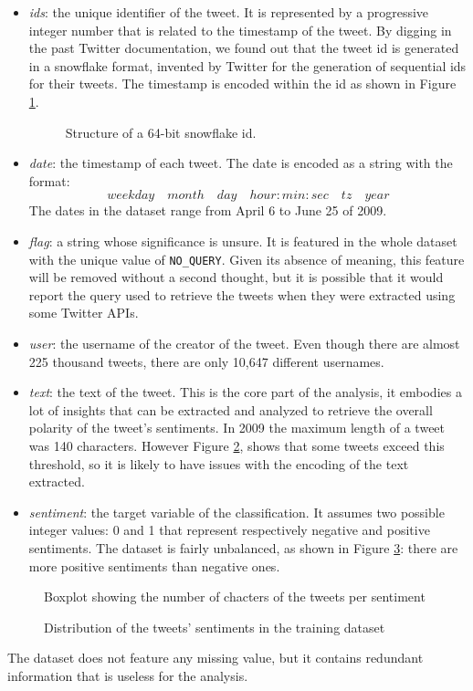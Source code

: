 \documentclass[conference]{IEEEtran}
\begin{document}
\begin{itemize}
    \item \textit{ids}: the unique identifier of the tweet. It is represented by a progressive integer number that is related to the timestamp of the tweet. By digging in the past Twitter documentation, we found out that the tweet id is generated in a snowflake format\cite{snowflake}, invented by Twitter for the generation of sequential ids for their tweets. The timestamp is encoded within the id as shown in Figure \ref{fig:snowflake}.
    \begin{figure}[h]
        \centering
        
        \caption{Structure of a 64-bit snowflake id.}
        \label{fig:snowflake}
\end{figure}
    \item \textit{date}: the timestamp of each tweet. The date is encoded as a string with the format:
    $$weekday \quad month \quad day \quad hour:min:sec \quad tz \quad year$$
    The dates in the dataset range from April 6 to June 25 of 2009.
    \item \textit{flag}: a string whose significance is unsure. It is featured in the whole dataset with the unique value of \texttt{NO\_QUERY}. Given its absence of meaning, this feature will be removed without a second thought, but it is possible that it would report the query used to retrieve the tweets when they were extracted using some Twitter APIs.
    \item \textit{user}: the username of the creator of the tweet. Even though there are almost 225 thousand tweets, there are only 10,647 different usernames.
    \item \textit{text}: the text of the tweet. This is the core part of the analysis, it embodies a lot of insights that can be extracted and analyzed to retrieve the overall polarity of the tweet's sentiments. In 2009 the maximum length of a tweet was 140 characters\cite{tweet_lenght}. However Figure \ref{fig:charcount}, shows that some tweets exceed this threshold, so it is likely to have issues with the encoding of the text extracted.
    \item \textit{sentiment}: the target variable of the classification. It assumes two possible integer values: 0 and 1 that represent respectively negative and positive sentiments. The dataset is fairly unbalanced, as shown in Figure \ref{fig:unbalanced}: there are more positive sentiments than negative ones.
\end{itemize}
\begin{figure}[h]
        \centering
        
        \caption{Boxplot showing the number of chacters of the tweets per sentiment}
        \label{fig:charcount}
\end{figure}
\begin{figure}[h]
        \centering
        
        \caption{Distribution of the tweets' sentiments in the training dataset}
        \label{fig:unbalanced}
\end{figure}
The dataset does not feature any missing value, but it contains redundant information that is useless for the analysis.
\end{document}
